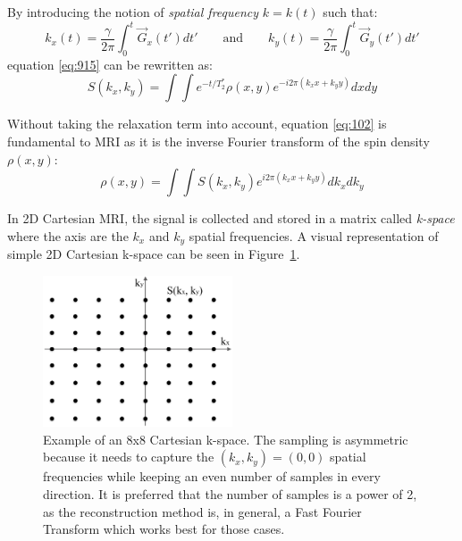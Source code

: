 By introducing the notion of \textit{spatial frequency} $k = k(t)$ such that:
\begin{equation}\label{eq:kspace}
    k_x(t) = \frac{\gamma}{2 \pi} \int_0^t \vec{G}_x(t') dt' 
    \qquad\text{and}\qquad
    k_y(t) = \frac{\gamma}{2 \pi} \int_0^t \vec{G}_y(t') dt' 
\end{equation}
equation \ref{eq:915} can be rewritten as:
\begin{equation}\label{eq:102}
    S(k_x, k_y) = \int \int e^{-t/T_2^*} \rho(x,y) e^{-i 2 \pi (k_x x + k_y y)} dx dy
\end{equation}

Without taking the relaxation term into account, equation \ref{eq:102} is fundamental to MRI as it is the inverse Fourier transform of the spin density $\rho(x,y)$:
\begin{equation}\label{eq:104}
    \rho(x,y) = \int \int S(k_x,k_y) e^{i 2 \pi (k_x x + k_y y)} dk_x dk_y
\end{equation}

In 2D Cartesian MRI, the signal is collected and stored in a matrix called \textit{k-space} where the axis are the $k_x$ and $k_y$ spatial frequencies. A visual representation of simple 2D Cartesian k-space can be seen in Figure~\ref{fig:ch10kspace}.

\begin{figure}[ht]
    \centering
    \includegraphics[width=0.5\textwidth,keepaspectratio]{images/mri/ch10kspace}
    \caption{Example of an 8x8 Cartesian k-space. The sampling is asymmetric because it needs to capture the $(k_x, k_y) = (0,0)$ spatial frequencies while keeping an even number of samples in every direction. It is preferred that the number of samples is a power of 2, as the reconstruction method is, in general, a Fast Fourier Transform which works best for those cases.}
    \label{fig:ch10kspace}
\end{figure}

\hfill

